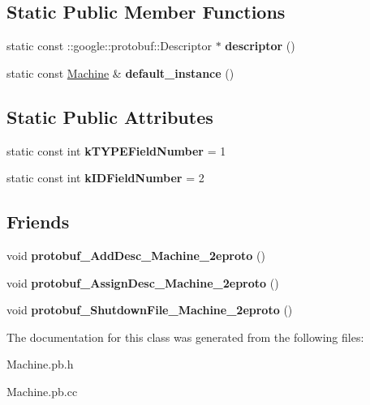 \subsection*{Static Public Member Functions}
\begin{DoxyCompactItemize}
\item 
static const \+::google\+::protobuf\+::\+Descriptor $\ast$ {\bfseries descriptor} ()\hypertarget{classmachines_1_1Machine_afd031b5e971083f0e7c0aaaa3558d36f}{}\label{classmachines_1_1Machine_afd031b5e971083f0e7c0aaaa3558d36f}

\item 
static const \hyperlink{classmachines_1_1Machine}{Machine} \& {\bfseries default\+\_\+instance} ()\hypertarget{classmachines_1_1Machine_ac32386f09022b17269958601d93f58b5}{}\label{classmachines_1_1Machine_ac32386f09022b17269958601d93f58b5}

\end{DoxyCompactItemize}
\subsection*{Static Public Attributes}
\begin{DoxyCompactItemize}
\item 
static const int {\bfseries k\+T\+Y\+P\+E\+Field\+Number} = 1\hypertarget{classmachines_1_1Machine_a841bad16ef5c0d88e5c06545215db687}{}\label{classmachines_1_1Machine_a841bad16ef5c0d88e5c06545215db687}

\item 
static const int {\bfseries k\+I\+D\+Field\+Number} = 2\hypertarget{classmachines_1_1Machine_aed921813c3247bfc663af77808511137}{}\label{classmachines_1_1Machine_aed921813c3247bfc663af77808511137}

\end{DoxyCompactItemize}
\subsection*{Friends}
\begin{DoxyCompactItemize}
\item 
void {\bfseries protobuf\+\_\+\+Add\+Desc\+\_\+\+Machine\+\_\+2eproto} ()\hypertarget{classmachines_1_1Machine_ab588f006d8ec48121b79de6050e1f8a3}{}\label{classmachines_1_1Machine_ab588f006d8ec48121b79de6050e1f8a3}

\item 
void {\bfseries protobuf\+\_\+\+Assign\+Desc\+\_\+\+Machine\+\_\+2eproto} ()\hypertarget{classmachines_1_1Machine_a4615177ebb310c1aa54ad33e1bf40d43}{}\label{classmachines_1_1Machine_a4615177ebb310c1aa54ad33e1bf40d43}

\item 
void {\bfseries protobuf\+\_\+\+Shutdown\+File\+\_\+\+Machine\+\_\+2eproto} ()\hypertarget{classmachines_1_1Machine_abdd3c852817cdd7a28aeb79f6757bde2}{}\label{classmachines_1_1Machine_abdd3c852817cdd7a28aeb79f6757bde2}

\end{DoxyCompactItemize}


The documentation for this class was generated from the following files\+:\begin{DoxyCompactItemize}
\item 
Machine.\+pb.\+h\item 
Machine.\+pb.\+cc\end{DoxyCompactItemize}
